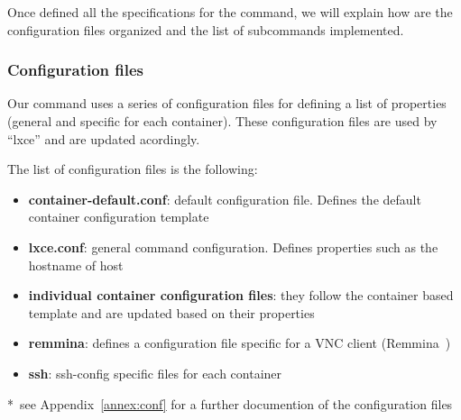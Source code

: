 Once defined all the specifications for the command, we will explain how are the configuration files organized and the list of subcommands implemented.


\subsubsection{Configuration files}
Our command uses a series of configuration files for defining a list of properties (general and specific for each container). These configuration files are used by ``lxce'' and are updated acordingly.

The list of configuration files is the following:
\begin{itemize}
	\item{\textbf{container-default.conf}: default configuration file. Defines the default container configuration template}
	\item{\textbf{lxce.conf}: general command configuration. Defines properties such as the hostname of host}
	\item{\textbf{individual container configuration files}: they follow the container based template and are updated based on their properties}
	\item{\textbf{remmina}: defines a configuration file specific for a VNC client (Remmina~\cite{remmina}) }
	\item{\textbf{ssh}: ssh-config specific files for each container }
\end{itemize}

*~see Appendix~\ref{annex:conf} for a further documention of the configuration files

